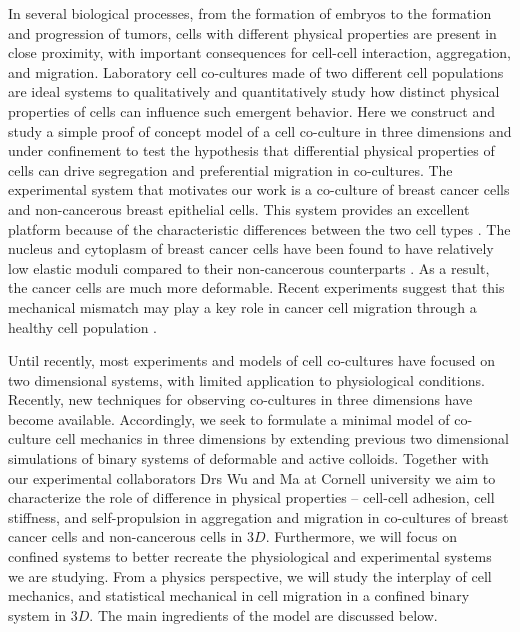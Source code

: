 \documentclass[aps,prb,twocolumn,groupedaddress,nofootinbib,floatfix]{revtex4}
\begin{document}
In several biological processes, from the formation of embryos to the formation and progression of tumors, cells with different physical properties are present in close proximity, with important
consequences for cell-cell interaction, aggregation, and migration. Laboratory cell co-cultures made of two different cell populations are ideal systems to qualitatively and quantitatively 
study how distinct physical properties of cells can influence such emergent behavior. Here we construct and study a simple proof of concept model of a cell co-culture in three dimensions 
and under confinement to test the hypothesis that differential physical properties of cells can drive segregation and preferential migration in co-cultures.   
The experimental system that motivates our work is a co-culture of breast cancer cells and non-cancerous breast epithelial cells. 
This system provides an excellent platform because of the characteristic differences between the two cell types \cite{Lee,mingming}. 
The nucleus and cytoplasm of breast cancer cells have been found to have relatively low elastic moduli compared to their non-cancerous counterparts \cite{Lee}. 
As a result, the cancer cells are much more deformable. Recent experiments suggest that this mechanical mismatch may play a key role in cancer cell migration through a healthy
cell population \cite{Lee}. 

Until recently, most experiments and models of cell co-cultures have focused on two dimensional systems, with limited application to physiological conditions\cite{Jong}.
Recently, new techniques for observing co-cultures in three dimensions have become available\citep{Alessandri}.  Accordingly, we seek to formulate a minimal
model of co-culture cell mechanics in three dimensions by extending previous two dimensional simulations of binary systems of deformable and active colloids\cite{Butcher}.
Together with our experimental collaborators Drs Wu and Ma at Cornell university we aim to characterize the role of difference in physical properties -- 
cell-cell adhesion, cell stiffness, and self-propulsion in  aggregation and migration in co-cultures of breast cancer cells and non-cancerous cells in $3D$.
Furthermore, we will focus on confined systems to better recreate the physiological and experimental systems we are studying.
From a physics perspective, we will study the interplay of cell mechanics, and statistical mechanical in cell migration in a confined binary system in $3D$.
The main ingredients of the model are discussed below.\\
\end{document}
